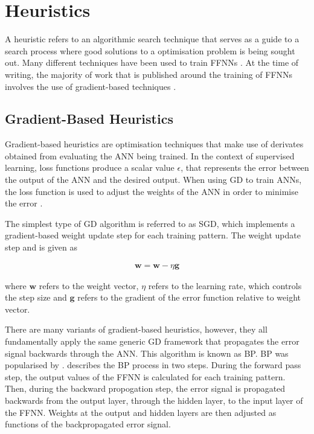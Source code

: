 \section{Heuristics}
\label{sec:heuristics}

A heuristic refers to an algorithmic search technique that serves as a guide to a search process where good solutions to a optimisation problem is being sought out. Many different techniques have been used to train \acp{FFNN} \cite{ref:kingma:2014}. At the time of writing, the majority of work that is published around the training of \acp{FFNN} involves the use of gradient-based techniques \cite{ref:nel:2021}.


\subsection{Gradient-Based Heuristics}\label{sec:heuristics:gd}

Gradient-based heuristics are optimisation techniques that make use of derivates obtained from evaluating the \acs{ANN} being trained. In the context of supervised learning, loss functions produce a scalar value $\epsilon$, that represents the error between the output of the \acs{ANN} and the desired output. When using \acs{GD} to train \acp{ANN}, the loss function is used to adjust the weights of the \acs{ANN} in order to minimise the error \cite{ref:engelbrecht:2007}.

The simplest type of \acs{GD} algorithm is referred to as \acs{SGD}, which implements a gradient-based weight update step for each training pattern. The weight update step and is given as

\begin{equation}
	\label{eq:heuristics:gd:sgd}
	\begin{split}
		\boldsymbol{w} = \boldsymbol{w} - \eta \boldsymbol{g}
	\end{split}
\end{equation}

where $\boldsymbol{w}$ refers to the weight vector, $\eta$ refers to the learning rate, which controls the step size and $\boldsymbol{g}$ refers to the gradient of the error function relative to weight vector.

There are many variants of gradient-based heuristics, however, they all fundamentally apply the same generic \acf{GD} framework that propagates the error signal backwards through the \acs{ANN}. This algorithm is known as \acf{BP}. \Acs{BP} was popularised by \citeauthor{ref:werbos:1994} \cite{ref:werbos:1994}. \citeauthor{ref:engelbrecht:2007} \cite{ref:engelbrecht:2007} describes the \acs{BP} process in two steps. During the forward pass step, the output values of the \acs{FFNN} is calculated for each training pattern. Then, during the backward propogation step, the error signal is propagated backwards from the output layer, through the hidden layer, to the input layer of the \acs{FFNN}. Weights at the output and hidden layers are then adjusted as functions of the backpropagated error signal.


